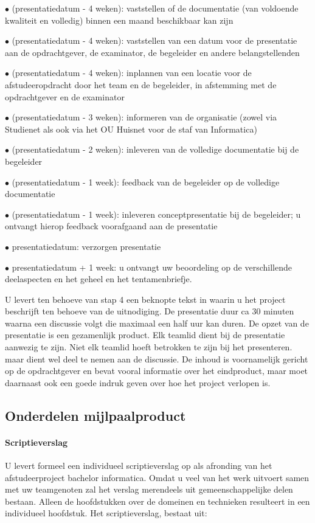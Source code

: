 \par $\bullet$ (presentatiedatum - 4 weken): vaststellen of de documentatie
	    (van voldoende kwaliteit en volledig) binnen een maand beschikbaar kan zijn
\par $\bullet$ (presentatiedatum - 4 weken): vaststellen van een datum voor
	    de presentatie aan de opdrachtgever, de examinator, de begeleider en andere
	    belangstellenden
\par $\bullet$ (presentatiedatum - 4 weken): inplannen van een locatie voor
	    de afstudeeropdracht door het team en de begeleider, in afstemming met de
	    opdrachtgever en de examinator
\par $\bullet$ (presentatiedatum - 3 weken): informeren van de organisatie
	    (zowel via Studienet als ook via het OU Huisnet voor de staf van Informatica)
\par $\bullet$ (presentatiedatum - 2 weken): inleveren van de volledige
	    documentatie bij de begeleider
\par $\bullet$ (presentatiedatum - 1 week): feedback van de begeleider op de
	    volledige documentatie
\par $\bullet$ (presentatiedatum - 1 week): inleveren conceptpresentatie bij
	    de begeleider; u ontvangt hierop feedback voorafgaand aan de presentatie
\par $\bullet$ presentatiedatum: verzorgen presentatie
\par $\bullet$ presentatiedatum + 1 week: u ontvangt uw beoordeling op de
	    verschillende deelaspecten en het geheel en het tentamenbriefje.

U levert ten behoeve van stap 4 een beknopte tekst in waarin u het project
beschrijft ten behoeve van de uitnodiging. De presentatie duur ca 30 minuten
waarna een discussie volgt die maximaal een half uur kan duren.
De opzet van de presentatie is een gezamenlijk product. Elk teamlid dient bij de
presentatie aanwezig te zijn. Niet elk teamlid hoeft betrokken te zijn bij het
presenteren. maar dient wel deel te nemen aan de discussie.
De inhoud is voornamelijk gericht op de opdrachtgever en bevat vooral informatie
over het eindproduct, maar moet daarnaast ook een goede indruk geven over hoe
het project verlopen is.

\subsection{Onderdelen mijlpaalproduct}
\paragraph{Scriptieverslag}
U levert formeel een individueel scriptieverslag op als afronding van
het afstudeerproject bachelor informatica. Omdat u veel van het werk uitvoert
samen met uw teamgenoten zal het verslag merendeels uit gemeenschappelijke delen
bestaan. Alleen de hoofdstukken over de domeinen en technieken resulteert in een
individueel hoofdstuk. Het scriptieverslag, bestaat uit:

